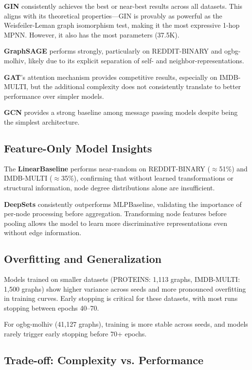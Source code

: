 \documentclass[11pt]{article}
\begin{document}
\textbf{GIN} consistently achieves the best or near-best results across all datasets. This aligns with its theoretical properties—GIN is provably as powerful as the Weisfeiler-Leman graph isomorphism test, making it the most expressive 1-hop MPNN. However, it also has the most parameters (37.5K).

\textbf{GraphSAGE} performs strongly, particularly on REDDIT-BINARY and ogbg-molhiv, likely due to its explicit separation of self- and neighbor-representations.

\textbf{GAT}'s attention mechanism provides competitive results, especially on IMDB-MULTI, but the additional complexity does not consistently translate to better performance over simpler models.

\textbf{GCN} provides a strong baseline among message passing models despite being the simplest architecture.

\subsection{Feature-Only Model Insights}

The \textbf{LinearBaseline} performs near-random on REDDIT-BINARY ($\approx$51\%) and IMDB-MULTI ($\approx$35\%), confirming that without learned transformations or structural information, node degree distributions alone are insufficient.

\textbf{DeepSets} consistently outperforms MLPBaseline, validating the importance of per-node processing before aggregation. Transforming node features before pooling allows the model to learn more discriminative representations even without edge information.

\subsection{Overfitting and Generalization}

Models trained on smaller datasets (PROTEINS: 1,113 graphs, IMDB-MULTI: 1,500 graphs) show higher variance across seeds and more pronounced overfitting in training curves. Early stopping is critical for these datasets, with most runs stopping between epochs 40--70.

For ogbg-molhiv (41,127 graphs), training is more stable across seeds, and models rarely trigger early stopping before 70+ epochs.

\subsection{Trade-off: Complexity vs. Performance}
\end{document}
